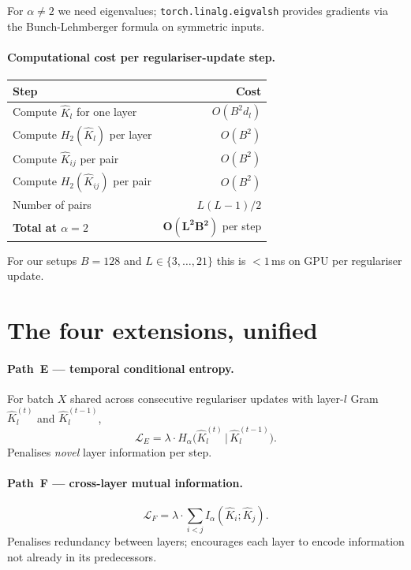 \documentclass[11pt,a4paper]{article}
\newcommand{\Khat}{\hat{K}}
\begin{document}
For $\alpha \neq 2$ we need eigenvalues; \texttt{torch.linalg.eigvalsh}
provides gradients via the Bunch-Lehmberger formula on symmetric inputs.

\paragraph{Computational cost per regulariser-update step.}
\begin{center}
\begin{tabular}{@{}lr@{}}
\toprule
Step & Cost \\
\midrule
Compute $\Khat_l$ for one layer            & $O(B^2 d_l)$ \\
Compute $H_2(\Khat_l)$ per layer            & $O(B^2)$ \\
Compute $\Khat_{ij}$ per pair               & $O(B^2)$ \\
Compute $H_2(\Khat_{ij})$ per pair          & $O(B^2)$ \\
Number of pairs                             & $L(L{-}1)/2$ \\
\midrule
\textbf{Total at $\alpha = 2$}              & $\bm{O(L^2 B^2)}$ per step \\
\bottomrule
\end{tabular}
\end{center}

For our setups $B = 128$ and $L \in \{3, \dots, 21\}$ this is
${<}1$\,ms on GPU per regulariser update.

\section{The four extensions, unified}

\paragraph{Path~E --- temporal conditional entropy.}
For batch $X$ shared across consecutive regulariser updates with
layer-$l$ Gram $\Khat_l^{(t)}$ and $\Khat_l^{(t-1)}$,
\[
\mathcal{L}_E = \lambda \cdot H_\alpha\bigl(\Khat_l^{(t)} \,\big|\,
                                                \Khat_l^{(t-1)}\bigr).
\]
Penalises \emph{novel} layer information per step.

\paragraph{Path~F --- cross-layer mutual information.}
\[
\mathcal{L}_F = \lambda \cdot \sum_{i < j} I_\alpha(\Khat_i ; \Khat_j).
\]
Penalises redundancy between layers; encourages each layer to encode
information not already in its predecessors.
\end{document}
